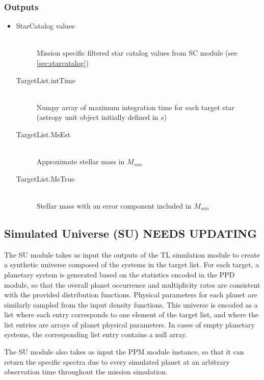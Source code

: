 \documentclass[cleanfoot]{asme2ej}
\begin{document}
\subsubsection*{Outputs}
\begin{itemize}
    \item 
    \begin{description}
        \item[StarCatalog values] \hfill \\
        Mission specific filtered star catalog values from SC module (see \ref{sec:starcatalog})
        \item[TargetList.intTime] \hfill \\
        Numpy array of maximum integration time for each target star (astropy unit object initially defined in $ s $)
        \item[TargetList.MsEst] \hfill \\
        Approximate stellar mass in $ M_{sun} $
        \item[TargetList.MsTrue] \hfill \\
        Stellar mass with an error component included in $ M_{sun} $
    \end{description}
\end{itemize}


\subsection{Simulated Universe (SU) NEEDS UPDATING}
The SU module takes as input the outputs of the TL simulation module to create a synthetic universe composed of the systems in the target list.  For each target, a planetary system is generated based on the statistics encoded in the PPD module, so that the overall planet occurrence and multiplicity rates are consistent with the provided distribution functions.  Physical parameters for each planet are similarly sampled from the input density functions.  This universe is encoded as a list where each entry corresponds to one element of the target list, and where the list entries are arrays of planet physical parameters.  In cases of empty planetary systems, the corresponding list entry contains a null array.

The SU module also takes as input the PPM module instance, so that it can return the specific spectra due to every simulated planet at an arbitrary observation time throughout the mission simulation.
\end{document}
